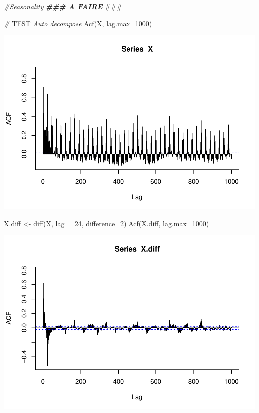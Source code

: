 \documentclass[
]{article}
\newenvironment{Shaded}{\begin{snugshade}}{\end{snugshade}}
\newcommand{\AlertTok}[1]{\textcolor[rgb]{0.94,0.16,0.16}{#1}}
\newcommand{\AttributeTok}[1]{\textcolor[rgb]{0.77,0.63,0.00}{#1}}
\newcommand{\CommentTok}[1]{\textcolor[rgb]{0.56,0.35,0.01}{\textit{#1}}}
\newcommand{\DecValTok}[1]{\textcolor[rgb]{0.00,0.00,0.81}{#1}}
\newcommand{\DocumentationTok}[1]{\textcolor[rgb]{0.56,0.35,0.01}{\textbf{\textit{#1}}}}
\newcommand{\FunctionTok}[1]{\textcolor[rgb]{0.00,0.00,0.00}{#1}}
\newcommand{\NormalTok}[1]{#1}
\newcommand{\OtherTok}[1]{\textcolor[rgb]{0.56,0.35,0.01}{#1}}
\begin{document}
\begin{Shaded}
\begin{Highlighting}[]
\CommentTok{\#Seasonality}
\DocumentationTok{\#\#\# A FAIRE }\AlertTok{\#\#\#}



\CommentTok{\# }\AlertTok{TEST}\CommentTok{ Auto decompose}
\FunctionTok{Acf}\NormalTok{(X, }\AttributeTok{lag.max=}\DecValTok{1000}\NormalTok{)}
\end{Highlighting}
\end{Shaded}

\includegraphics{STA202_report_files/figure-latex/unnamed-chunk-11-10.pdf}

\begin{Shaded}
\begin{Highlighting}[]
\NormalTok{X.diff }\OtherTok{\textless{}{-}} \FunctionTok{diff}\NormalTok{(X, }\AttributeTok{lag =} \DecValTok{24}\NormalTok{, }\AttributeTok{difference=}\DecValTok{2}\NormalTok{)}
\FunctionTok{Acf}\NormalTok{(X.diff, }\AttributeTok{lag.max=}\DecValTok{1000}\NormalTok{)}
\end{Highlighting}
\end{Shaded}

\includegraphics{STA202_report_files/figure-latex/unnamed-chunk-11-11.pdf}
\end{document}
